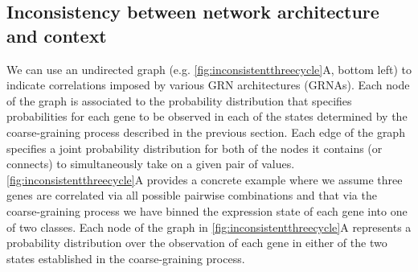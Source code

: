 \subsection{Inconsistency between network architecture and context}
We can use an undirected graph (e.g. \ref{fig:inconsistentthreecycle}A, bottom left) to indicate correlations imposed by various GRN architectures (GRNAs). Each node of the graph is associated to the probability distribution that specifies probabilities for each gene to be observed in each of the states determined by the coarse-graining process described in the previous section. Each edge of the graph specifies a joint probability distribution for both of the nodes it contains (or connects) to simultaneously take on a given pair of values.
\ref{fig:inconsistentthreecycle}A provides a concrete example where we assume three genes are correlated via all possible pairwise combinations and that via the coarse-graining process we have binned the expression state of each gene into one of two classes.
Each node of the graph in \ref{fig:inconsistentthreecycle}A represents a probability distribution over the observation of each gene in either of the two states established in the coarse-graining process.
